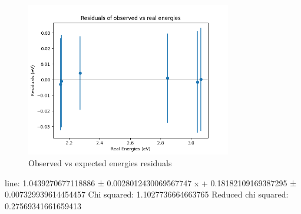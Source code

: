 \begin{figure}
    \centering
    \includegraphics[width=0.8\textwidth]{Results/Sections/Part1/Part1_energy_observed_vs_expected_residuals.png}
    \caption{Observed vs expected energies residuals}
    \label{fig:Part1energyU}
\end{figure}

line: 1.0439270677118886 ± 0.0028012430069567747 x + 0.18182109169387295 ± 0.007329939614454457
Chi squared: 1.1027736664663765
Reduced chi squared: 0.27569341661659413